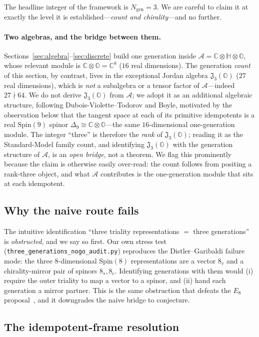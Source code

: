 \documentclass[11pt,a4paper]{article}
\theoremstyle{plain}
\newcommand{\CHO}{\mathbb{C}\otimes\mathbb{H}\otimes\mathbb{O}}
\newcommand{\Alg}{\mathcal{A}}
\newcommand{\JO}{\mathfrak{J}_3(\mathbb{O})}
\newcommand{\Spin}{\mathrm{Spin}}
\newcommand{\code}[1]{\texttt{#1}}
\begin{document}
The headline integer of the framework is $N_{\mathrm{gen}}=3$. We are careful to
claim it at exactly the level it is established---\emph{count and chirality}---and
no further.

\paragraph{Two algebras, and the bridge between them.}
Sections~\ref{sec:algebra}--\ref{sec:discrete} build one generation
inside $\Alg = \CHO$, whose relevant module is
$\mathbb{C}\otimes\mathbb{O} = \mathbb{C}^8$ ($16$ real dimensions). The
generation \emph{count} of this section, by contrast, lives in the exceptional
Jordan algebra $\JO$ ($27$ real dimensions), which is \emph{not} a subalgebra or a
tensor factor of $\Alg$---indeed $27 \nmid 64$. We do not derive $\JO$ from
$\Alg$; we adopt it as an additional algebraic structure, following
Dubois-Violette--Todorov and Boyle, motivated by the observation below that the
tangent space at each of its primitive idempotents is a real $\Spin(9)$ spinor
$\Delta_9 \cong \mathbb{C}\otimes\mathbb{O}$---the same $16$-dimensional
one-generation module. The integer ``three'' is therefore the \emph{rank} of
$\JO$; reading it as the Standard-Model family count, and identifying $\JO$ with
the generation structure of $\Alg$, is an \emph{open bridge}, not a theorem. We
flag this prominently because the claim is otherwise easily over-read: the count
follows from positing a rank-three object, and what $\Alg$ contributes is the
one-generation module that sits at each idempotent.

\subsection{Why the naive route fails}

The intuitive identification ``three triality representations $=$ three
generations'' is \emph{obstructed}, and we say so first. Our own stress test
(\code{three\_generations\_nogo\_audit.py}) reproduces the Distler--Garibaldi
failure mode: the three 8-dimensional $\Spin(8)$ representations are a vector
$8_v$ and a chirality-mirror pair of spinors $8_s, 8_c$. Identifying generations
with them would (i) require the outer triality to map a vector to a spinor, and
(ii) hand each generation a mirror partner. This is the same obstruction that
defeats the $E_8$ proposal~\cite{distler2010}, and it downgrades the naive bridge
to conjecture.

\subsection{The idempotent-frame resolution}
\end{document}
